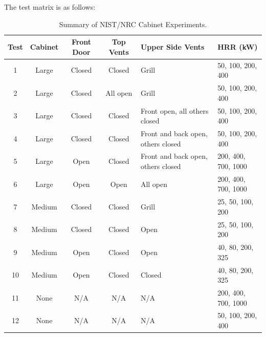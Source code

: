 The test matrix is as follows:
\begin{table}[!ht]
\caption{Summary of NIST/NRC Cabinet Experiments.}
\begin{center}
\begin{tabular}{|c|c|c|c|l|l|}
\hline
Test   & Cabinet    & Front Door & Top Vents        & Upper Side Vents                   & HRR (kW)               \\ \hline \hline
1      & Large      & Closed     & Closed           & Grill                              & 50, 100, 200, 400      \\ \hline
2      & Large      & Closed     & All open         & Grill                              & 50, 100, 200, 400      \\ \hline
3      & Large      & Closed     & Closed           & Front open, all others closed      & 50, 100, 200, 400      \\ \hline
4      & Large      & Closed     & Closed           & Front and back open, others closed & 50, 100, 200, 400      \\ \hline
5      & Large      & Open       & Closed           & Front and back open, others closed & 200, 400, 700, 1000    \\ \hline
6      & Large      & Open       & Open             & All open                           & 200, 400, 700, 1000    \\ \hline
7      & Medium     & Closed     & Closed           & Grill                              & 25, 50, 100, 200       \\ \hline
8      & Medium     & Closed     & Closed           & Open                               & 25, 50, 100, 200       \\ \hline
9      & Medium     & Open       & Closed           & Open                               & 40, 80, 200, 325       \\ \hline
10     & Medium     & Open       & Closed           & Closed                             & 40, 80, 200, 325       \\ \hline
11     & None       & N/A        & N/A              & N/A                                & 200, 400, 700, 1000    \\ \hline
12     & None       & N/A        & N/A              & N/A                                & 50, 100, 200, 400      \\ \hline
\end{tabular}
\end{center}
\label{tab:NIST_Cabinet_Experiments}
\end{table}


